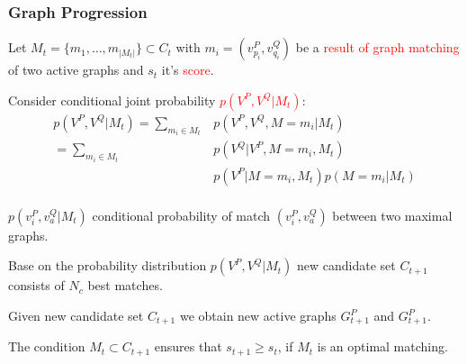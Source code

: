 \documentclass[hyperref={pdfpagelabels=false}]{beamer}
\begin{document}
\begin{frame} [allowframebreaks]
\frametitle{Graph Progression}
Let $M_t=\{m_1,\dots,m_{|M_t|}\}\subset C_t$ with $m_i=(v_{p_i}^P,v_{q_i}^Q)$ be a \textcolor{red}{result of graph matching} of two active graphs and $s_t$ it's \textcolor{red}{score}.

Consider conditional joint probability \textcolor{red}{$p(V^P,V^Q|M_t)$}:
\begin{align*}
	p(V^P,V^Q|M_t) = \sum_{m_i\in M_t}& p(V^P,V^Q,M=m_i|M_t) \\
				   = \sum_{m_i\in M_t}& p(V^Q|V^P,M=m_i,M_t)\\
				   & p(V^P|M=m_i, M_t) p(M=m_i|M_t)\\
\end{align*}

\framebreak

$p(v_i^P,v_a^Q|M_t)$	conditional probability of match $(v_i^P,v_a^Q)$ between two maximal graphs.

Base on the probability distribution $p(V^P,V^Q|M_t)$ new candidate set $C_{t+1}$ consists of $N_c$ best matches. 

Given new candidate set $C_{t+1}$ we obtain new active graphs $G_{t+1}^P$ and $G_{t+1}^P$.

The condition $M_t\subset C_{t+1}$ ensures that $s_{t+1}\ge s_t$, if $M_t$ is an optimal matching. 

\end{frame}
\end{document}
